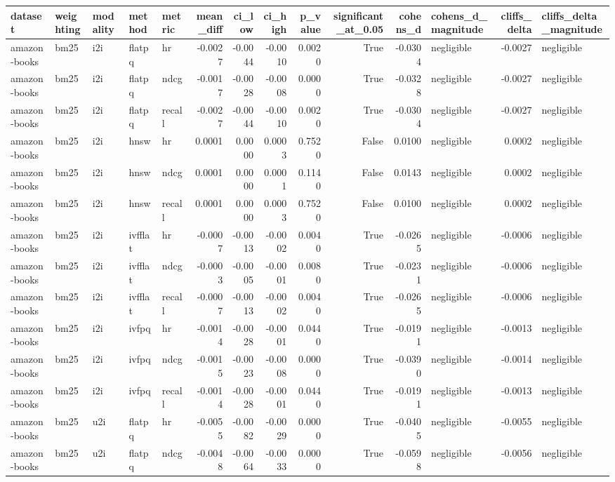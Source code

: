 \begin{tabular}{lllllrrrrrrlrl}
\toprule
dataset & weighting & modality & method & metric & mean_diff & ci_low & ci_high & p_value & significant_at_0.05 & cohens_d & cohens_d_magnitude & cliffs_delta & cliffs_delta_magnitude \\
\midrule
amazon-books & bm25 & i2i & flatpq & hr & -0.0027 & -0.0044 & -0.0010 & 0.0020 & True & -0.0304 & negligible & -0.0027 & negligible \\
amazon-books & bm25 & i2i & flatpq & ndcg & -0.0017 & -0.0028 & -0.0008 & 0.0000 & True & -0.0328 & negligible & -0.0027 & negligible \\
amazon-books & bm25 & i2i & flatpq & recall & -0.0027 & -0.0044 & -0.0010 & 0.0020 & True & -0.0304 & negligible & -0.0027 & negligible \\
amazon-books & bm25 & i2i & hnsw & hr & 0.0001 & 0.0000 & 0.0003 & 0.7520 & False & 0.0100 & negligible & 0.0002 & negligible \\
amazon-books & bm25 & i2i & hnsw & ndcg & 0.0001 & 0.0000 & 0.0001 & 0.1140 & False & 0.0143 & negligible & 0.0002 & negligible \\
amazon-books & bm25 & i2i & hnsw & recall & 0.0001 & 0.0000 & 0.0003 & 0.7520 & False & 0.0100 & negligible & 0.0002 & negligible \\
amazon-books & bm25 & i2i & ivfflat & hr & -0.0007 & -0.0013 & -0.0002 & 0.0040 & True & -0.0265 & negligible & -0.0006 & negligible \\
amazon-books & bm25 & i2i & ivfflat & ndcg & -0.0003 & -0.0005 & -0.0001 & 0.0080 & True & -0.0231 & negligible & -0.0006 & negligible \\
amazon-books & bm25 & i2i & ivfflat & recall & -0.0007 & -0.0013 & -0.0002 & 0.0040 & True & -0.0265 & negligible & -0.0006 & negligible \\
amazon-books & bm25 & i2i & ivfpq & hr & -0.0014 & -0.0028 & -0.0001 & 0.0440 & True & -0.0191 & negligible & -0.0013 & negligible \\
amazon-books & bm25 & i2i & ivfpq & ndcg & -0.0015 & -0.0023 & -0.0008 & 0.0000 & True & -0.0390 & negligible & -0.0014 & negligible \\
amazon-books & bm25 & i2i & ivfpq & recall & -0.0014 & -0.0028 & -0.0001 & 0.0440 & True & -0.0191 & negligible & -0.0013 & negligible \\
amazon-books & bm25 & u2i & flatpq & hr & -0.0055 & -0.0082 & -0.0029 & 0.0000 & True & -0.0405 & negligible & -0.0055 & negligible \\
amazon-books & bm25 & u2i & flatpq & ndcg & -0.0048 & -0.0064 & -0.0033 & 0.0000 & True & -0.0598 & negligible & -0.0056 & negligible \\

\end{tabular}
